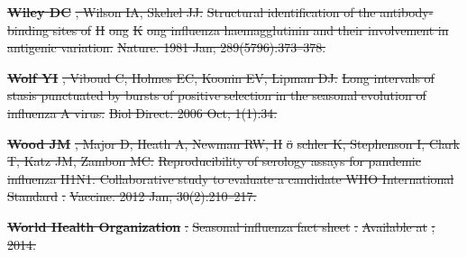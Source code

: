 \documentclass[9pt,lineno]{elife} %
\providecommand{\DIFdel}[1]{{\protect\color{red}\sout{#1}}}                      %
\providecommand{\DIFdeltex}[1]{{\protect\color{red}\sout{#1}}}                      %
\providecommand{\DIFdel}[1]{\texorpdfstring{\DIFdeltex{#1}}{}} %
\begin{document}
\textbf{%
\DIFdel{Wiley DC}}%
\DIFdel{, Wilson IA, Skehel JJ.
}%
\DIFdel{Structural identification of the antibody-binding sites of }%
\DIFdel{H}%
\DIFdel{ong
  }%
\DIFdel{K}%
\DIFdel{ong influenza haemagglutinin and their involvement in antigenic
  variation.}%
\DIFdel{Nature.  1981 Jan; 289(5796):373--378.
}%

\textbf{%
\DIFdel{Wolf YI}}%
\DIFdel{, Viboud C, Holmes EC, Koonin EV,
  Lipman DJ.
}%
\DIFdel{Long intervals of stasis punctuated by bursts of positive selection
  in the seasonal evolution of influenza A virus.}%
\DIFdel{Biol Direct.  2006 Oct; 1(1):34.
}%

\textbf{%
\DIFdel{Wood JM}}%
\DIFdel{, Major D, Heath A, Newman RW,
  H}%
\DIFdel{\"o}%
\DIFdel{schler K, Stephenson I, Clark T, Katz JM, Zambon MC.
}%
\DIFdel{Reproducibility of serology assays for pandemic influenza H1N1:
  Collaborative study to evaluate a candidate WHO International Standard}%
\DIFdel{.
}%
\DIFdel{Vaccine.  2012 Jan; 30(2):210--217.
}%

\textbf{%
\DIFdel{World Health Organization}%
}%
\DIFdel{.
}%
\DIFdel{Seasonal influenza fact sheet}%
\DIFdel{.
}%
\DIFdel{Available at
  }%
\DIFdel{; 2014.
}%
\end{document}
